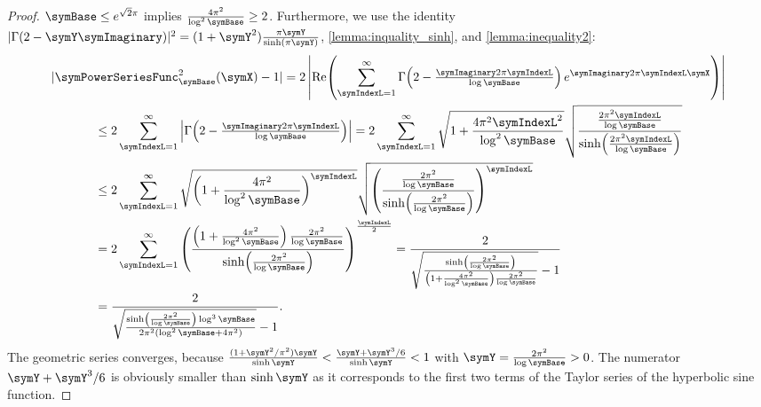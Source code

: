 \documentclass[sigconf, nonacm]{acmart}
\begin{document}
\begin{proof}
$\symBase \leq e^{\sqrt{2}\pi}$ implies $\frac{4\pi^2}{\log^2\symBase}\geq 2$. Furthermore, 
we use the identity $|\Gamma(2-\symY\symImaginary)|^2 = (1 + \symY^2)\frac{\pi\symY}{\sinh(\pi\symY)}$, \cref{lemma:inquality_sinh}, and \cref{lemma:inequality2}:
\begin{multline*}
|\symPowerSeriesFunc_\symBase^2(\symX) - 1|
=
2\left|\operatorname{Re}\!\left(\sum_{\symIndexL=1}^\infty \Gamma\!\left(2 - \textstyle\frac{\symImaginary 2\pi \symIndexL}{\log \symBase}\right)e^{ \symImaginary 2\pi\symIndexL \symX}\right)\right|
\\
\begin{aligned}
&\leq
2
\sum_{\symIndexL=1}^\infty
\left|
\Gamma\!\left(2 - \textstyle\frac{\symImaginary 2\pi \symIndexL}{\log \symBase}\right)
\right|
=
2
\sum_{\symIndexL=1}^\infty
\sqrt{1+\frac{4\pi^2\symIndexL^2}{\log^2\symBase}}
\sqrt{
\frac{\textstyle\frac{2\pi^2\symIndexL}{\log \symBase}}{\sinh\!\left(\textstyle\frac{2\pi^2  \symIndexL}{\log \symBase}\right)}
}
\\
&\leq
2
\sum_{\symIndexL=1}^\infty
\sqrt{\left(1+\frac{4\pi^2}{\log^2\symBase}\right)^\symIndexL}
\sqrt{
\left(\frac{\textstyle\frac{2\pi^2}{\log \symBase}}{\sinh\!\left(\textstyle\frac{2\pi^2}{\log \symBase}\right)}
\right)^\symIndexL}
\\
&=
2
\sum_{\symIndexL=1}^\infty
\left(
\frac{\textstyle\left(1+\frac{4\pi^2}{\log^2\symBase}\right)\frac{2\pi^2}{\log \symBase}}{\sinh\!\left(\textstyle\frac{2\pi^2}{\log \symBase}\right)}
\right)^\frac{\symIndexL}{2}
=
\frac{2}{\sqrt{
\frac{\sinh\left(\frac{2\pi^2}{\log \symBase}\right)
}{
\left(1+\frac{4\pi^2}{\log^2\symBase}\right)\frac{2\pi^2}{\log \symBase}
}
}
-1
}
\\
&=
\frac{2}{\sqrt{
\frac{\sinh\left(\frac{2\pi^2}{\log \symBase}\right)
\log^3 \symBase
}{
2\pi^2(\log^2\symBase+4\pi^2)
}
}
-1
}.
\end{aligned}
\end{multline*}
The geometric series converges, because $\frac{(1+\symY^2/\pi^2)\symY}{\sinh\symY}<\frac{\symY+\symY^3/6}{\sinh\symY} <1$ with $\symY = \frac{2\pi^2}{\log \symBase} > 0$. The numerator $\symY+\symY^3/6$ is obviously smaller than $\sinh\symY$ as it corresponds to the first two terms of the Taylor series of the hyperbolic sine function.
\end{proof}
\end{document}
